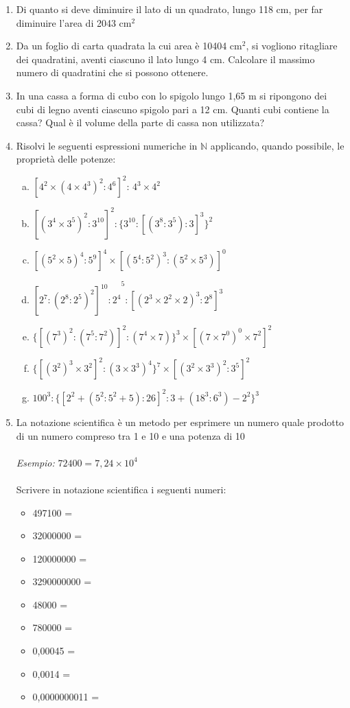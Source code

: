 \documentclass[]{article}
\newcommand*\result[1] {\hspace*{0em plus 1fill}{\footnotesize \makebox{[#1]}}}
\begin{document}
\begin{enumerate}
	\item {Di quanto si deve diminuire il lato di un quadrato, lungo 118 cm, per far diminuire l'area di 2043 cm\(^2\)} \result{9 cm}
	
	\item {Da un foglio di carta quadrata la cui area è 10404 cm\(^2\), si vogliono ritagliare dei quadratini, aventi ciascuno il lato lungo 4 cm. Calcolare il massimo numero di quadratini che si possono ottenere.} \result{650}
	
	\item {In una cassa a forma di cubo con lo spigolo lungo 1,65 m si ripongono dei cubi di legno aventi ciascuno spigolo pari a 12 cm. Quanti cubi contiene la cassa? Qual è il volume della parte di cassa non utilizzata?} \result{2197; 696 cm\(^3\)}
	
	\item {Risolvi le seguenti espressioni numeriche in \(\mathbb{N}\) applicando, quando possibile, le proprietà delle potenze:
		\begin{enumerate}[a.]
			\item \([4^2\times(4\times4^3)^2:4^6]^2:\,4^3\times4^2\) \result{\(4^3\)}
			\item \([(3^4\times3^5)^2:3^{10}]^2:\{3^{10}:[(3^8:3^5):3]^3\}^2\) \result{\(3^8\)}
			\item \([(5^2\times5)^4:5^9]^4\times[(5^4:5^2)^3:(5^2\times5^3)]^0\) \result{\(5^12\)}
			\item \({[2^7:(2^8:2^5)^2]^{10}:2^4}^5:[(2^3\times2^2\times2)^3:2^8]^3\) \result{1}
			\item \(\{[(7^3)^2:(7^5:7^2)]^2:(7^4\times7)\}^3\times[(7\times7^0)^0\times7^2]^2\) \result{\(7^7\)}
			\item \(\{[(3^2)^3\times3^2]^2:(3\times3^3)^4\}^7\times[(3^2\times3^3)^2:3^5]^2\) \result{\(3^{10}\)}
			\item \(100^3:\{[2^2+(5^2:5^2+5):26]^2:3+(18^3:6^3)-2^2\}^3\) \result{8}
		\end{enumerate}
	}

	\item {La notazione scientifica è un metodo per esprimere un numero quale prodotto di un numero compreso tra 1 e 10 e una potenza di 10 \\ \\ \textit{Esempio: } \(72400 = 7,24 \times 10^4\) \\ \\ Scrivere in notazione scientifica i seguenti numeri:
	\begin{itemize}
			\item 497100 =
			\item 32000000 =
			\item 120000000 =
			\item 3290000000 =
			\item 48000 =
			\item 780000 =
			\item 0,00045 =
			\item 0,0014 =
			\item 0,0000000011 = 
	\end{itemize}
	}


\end{enumerate}
\end{document}
